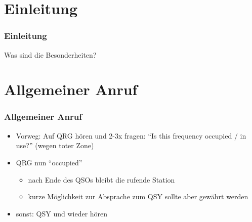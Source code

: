 

\subtitle{Betriebstechnik/Vorschriften 10: \\
  Betriebsabwicklung auf Kurzwelle \\[2em]}
\date{Stand 28.11.2016}


\section{Einleitung}

\begin{frame}
  \frametitle{Einleitung}

  Was sind die Besonderheiten?

\end{frame}

\section{Allgemeiner Anruf}

\begin{frame}
  \frametitle{Allgemeiner Anruf}

  \begin{itemize}
    \item Vorweg: Auf QRG hören und 2-3x fragen: ``Is this frequency occupied /
      in use?'' (wegen toter Zone)
    \item QRG nun ``occupied''
      \begin{itemize}
        \item nach Ende des QSOs bleibt die rufende Station
        \item kurze Möglichkeit zur Absprache zum QSY sollte aber gewährt werden
      \end{itemize}
    \item sonst: QSY und wieder hören
  \end{itemize}

\end{frame}

